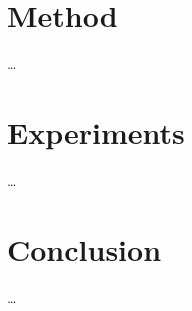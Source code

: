 \documentclass{article}
\begin{document}
{
    \section{Method}
    \label{sec:method}

    …
}

{
    \section{Experiments}
    \label{sec:experiments}

    …
}

{
    \section{Conclusion}
    \label{sec:conclusion}

    …
}

{
    
}
\end{document}
